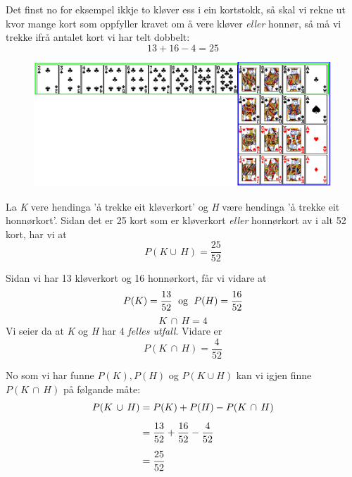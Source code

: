Det finst no for eksempel ikkje to kløver ess i ein kortstokk, så skal vi rekne ut kvor mange kort som oppfyller kravet om å vere kløver \textsl{eller} honnør, så må vi trekke ifrå antalet kort vi har telt dobbelt:
$$ 13+16-4=25 $$
	\begin{figure}[H]
		\centering
		\includegraphics[scale=0.45]{kort3}
	\end{figure}

La \textit{K} vere hendinga 'å trekke eit kløverkort' og \textit{H} være hendinga 'å trekke eit honnørkort'. Sidan det er 25 kort som er kløverkort \textsl{eller} honnørkort av i alt 52 kort, har vi at
$$P(K\cup\,H)=\frac{25}{52}$$

Sidan vi har 13 kløverkort og 16 honnørkort, får vi vidare at
$$P(K)=\frac{13}{52} \text{\; og \;} P(H)=\frac{16}{52}$$
\qquad
{} \vs
\[ K\,\cap\,H=4 \]
Vi seier da at \textit{K} og \textit{H} har 4 \textit{felles utfall}.
Vidare er
\[ P(K\,\cap\,H)=\frac{4}{52} \]

No som vi har funne $ P(K), P(H)$ og $P(K\cup H)$ kan vi igjen finne  $P(K\,\cap\,H)$ på følgande måte:
\begin{align*}
P(K\,\cup\,H)&=P(K)+P(H)-P(K\,\cap\,H) \br
&= \frac{13}{52}+\frac{16}{52}-\frac{4}{52} \br
&= \frac{25}{52}
\end{align*}

